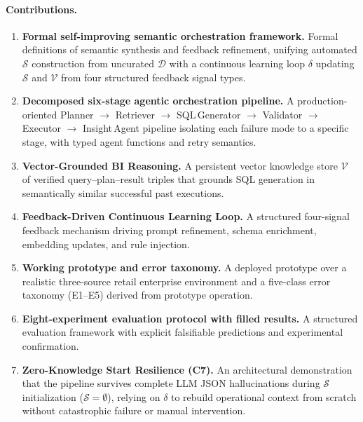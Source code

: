 \documentclass[11pt,a4paper]{article}
\newcommand{\C}[1]{\mathcal{#1}}
\begin{document}
\paragraph{Contributions.}
\begin{enumerate}[leftmargin=1.5em,label=\textbf{C\arabic*}]
  \item \textbf{Formal self-improving semantic orchestration framework.}  Formal
        definitions of semantic synthesis and feedback refinement, unifying automated
        $\C{S}$ construction from uncurated $\C{D}$ with a continuous learning loop
        $\delta$ updating $\C{S}$ and $\C{V}$ from four structured feedback signal types.
  \item \textbf{Decomposed six-stage agentic orchestration pipeline.}  A
        production-oriented Planner $\to$ Retriever $\to$ SQL\,Generator $\to$
        Validator $\to$ Executor $\to$ Insight\,Agent pipeline isolating each failure
        mode to a specific stage, with typed agent functions and retry semantics.
  \item \textbf{Vector-Grounded BI Reasoning.}  A persistent vector knowledge
        store $\C{V}$ of verified query--plan--result triples that grounds SQL
        generation in semantically similar successful past executions.
  \item \textbf{Feedback-Driven Continuous Learning Loop.}  A structured
        four-signal feedback mechanism driving prompt refinement, schema enrichment,
        embedding updates, and rule injection.
  \item \textbf{Working prototype and error taxonomy.}  A deployed prototype over
        a realistic three-source retail enterprise environment and a five-class error
        taxonomy (E1--E5) derived from prototype operation.
  \item \textbf{Eight-experiment evaluation protocol with filled results.}  A
        structured evaluation framework with explicit falsifiable predictions and
        experimental confirmation.
  \item \textbf{Zero-Knowledge Start Resilience (C7).}  An architectural
        demonstration that the pipeline survives complete LLM JSON hallucinations
        during $\mathcal{S}$ initialization ($\mathcal{S}{=}\emptyset$), relying on
        $\delta$ to rebuild operational context from scratch without catastrophic
        failure or manual intervention.
\end{enumerate}

\end{document}
